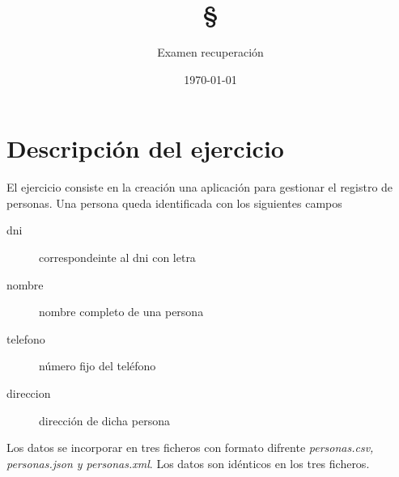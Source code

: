\documentclass[4paper]{article}
\author{Examen recuperación}
\title{\textbf{\S}}
\date{\today}
\begin{document}
\maketitle 
\section*{Descripción del ejercicio}
El ejercicio consiste en la creación una aplicación para gestionar el registro de personas. Una persona queda identificada con los siguientes campos
\begin{description}
\item[dni] correspondeinte al dni con letra
\item[nombre] nombre completo de una persona
\item[telefono] número fijo del teléfono
\item[direccion] dirección de dicha persona
\end{description}
Los datos se incorporar en tres ficheros con formato difrente \emph{personas.csv, personas.json y personas.xml}. Los datos son idénticos en los tres ficheros.
\end{document}
